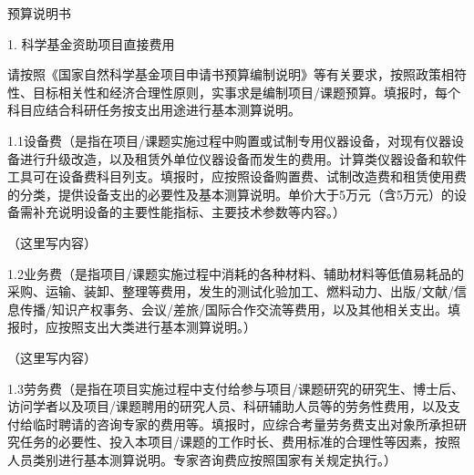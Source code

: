 \documentclass[12pt, a4paper]{ctexart}
\newcommand{\fangsonggb}{\CJKfamily{fsgb}}
\newcommand{\instruction}[1]{{\fangsonggb\linespread{1.3}\selectfont\setlength{\parskip}{8bp} #1 \par}}
\begin{document}
{\noindent\centering\heiti{} 预算说明书\par}

\begin{mdframed}[
    linecolor=black,
    linewidth=0.5pt,
    backgroundcolor=white,
    roundcorner=0pt,
    everyline=true,
    userdefinedwidth=16.09cm,
    leftmargin=-0.725cm,
    rightmargin=0.725cm,
    innertopmargin=0cm,
    innerbottommargin=0.2cm,
    innerleftmargin=0.05cm,
    innerrightmargin=0.05cm
]
\songti\fontsize{9bp}{9pt}\selectfont
\setlength{\parindent}{2em}

{\bfseries\indent\fangsonggb

1. 科学基金资助项目直接费用\par
请按照《国家自然科学基金项目申请书预算编制说明》等有关要求，按照政策相符性、目标相关性和经济合理性原则，实事求是编制项目/课题预算。填报时，每个科目应结合科研任务按支出用途进行基本测算说明。}

\vspace{0.5em}

\instruction{1.1\hspace{0.75em}设备费（是指在项目/课题实施过程中购置或试制专用仪器设备，对现有仪器设备进行升级改造，以及租赁外单位仪器设备而发生的费用。计算类仪器设备和软件工具可在设备费科目列支。填报时，应按照设备购置费、试制改造费和租赁使用费的分类，提供设备支出的必要性及基本测算说明。单价大于5万元（含5万元）的设备需补充说明设备的主要性能指标、主要技术参数等内容。）}
\vspace{0.3em}

（这里写内容）

\instruction{1.2\hspace{0.75em}业务费（是指项目/课题实施过程中消耗的各种材料、辅助材料等低值易耗品的采购、运输、装卸、整理等费用，发生的测试化验加工、燃料动力、出版/文献/信息传播/知识产权事务、会议/差旅/国际合作交流等费用，以及其他相关支出。填报时，应按照支出大类进行基本测算说明。）}
\vspace{0.3em}

（这里写内容）

\instruction{1.3\hspace{0.75em}劳务费（是指在项目实施过程中支付给参与项目/课题研究的研究生、博士后、访问学者以及项目/课题聘用的研究人员、科研辅助人员等的劳务性费用，以及支付给临时聘请的咨询专家的费用等。填报时，应综合考量劳务费支出对象所承担研究任务的必要性、投入本项目/课题的工作时长、费用标准的合理性等因素，按照人员类别进行基本测算说明。专家咨询费应按照国家有关规定执行。）}
\vspace{0.3em}


\end{mdframed}
\end{document}
